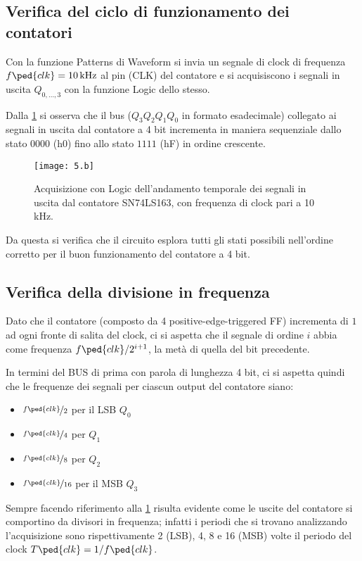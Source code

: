 \documentclass[10pt, a4paper, italian]{article}
\begin{document}
\subsection{Verifica del ciclo di funzionamento dei contatori}
\label{sec: count_base}
Con la funzione Patterns di Waveform si invia un segnale di clock di
frequenza $f\ped{clk} = \SI{10}{k\Hz}$ al pin (CLK) del contatore e si
acquisiscono i segnali in uscita $Q_{0, \ldots, 3}$ con la funzione Logic
dello stesso.

Dalla \cref{fig: Count_Clock} si osserva che il bus ($Q_3 Q_2 Q_1 Q_0$ in
formato esadecimale) collegato ai segnali in uscita dal contatore a 4 bit
incrementa in maniera sequenziale dallo stato $0000$ (h0) fino allo stato
$1111$ (hF) in ordine crescente.
\begin{figure}[htbp]
\centering
	\texttt{[image: 5.b]}
	\caption{Acquisizione con Logic dell'andamento temporale dei segnali in
	uscita dal contatore SN74LS163, con frequenza di clock pari a 10 kHz.
	\label{fig: Count_Clock}}
\end{figure}

Da questa si verifica che il circuito esplora tutti gli stati possibili
nell'ordine corretto per il buon funzionamento del contatore a 4 bit.

\subsection{Verifica della divisione in frequenza}
Dato che il contatore (composto da 4 positive-edge-triggered FF) incrementa
di $1$ ad ogni fronte di salita del clock, ci si aspetta che il segnale di
ordine $i$ abbia come frequenza $f\ped{clk}/2^{i+1}$, la metà di quella del
bit precedente.

In termini del BUS di prima con parola di lunghezza 4 bit, ci si aspetta
quindi che le frequenze dei segnali per ciascun output del contatore siano:
\begin{itemize}
\item $\nicefrac{f\ped{clk}}{2}$ per il LSB $Q_0$
\item $\nicefrac{f\ped{clk}}{4}$ per $Q_1$
\item $\nicefrac{f\ped{clk}}{8}$ per $Q_2$
\item $\nicefrac{f\ped{clk}}{16}$ per il MSB $Q_3$
\end{itemize}
Sempre facendo riferimento alla \cref{fig: Count_Clock} risulta evidente come
le uscite del contatore si comportino da divisori in frequenza; infatti i
periodi che si trovano analizzando l'acquisizione sono rispettivamente 2 (LSB),
4, 8 e 16 (MSB) volte il periodo del clock $T\ped{clk} = 1/f\ped{clk}$.
\end{document}
